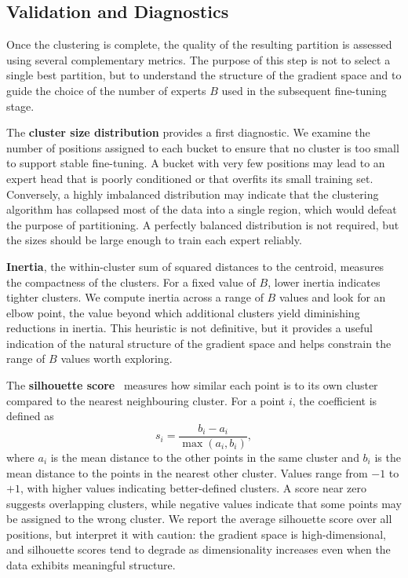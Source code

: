 \subsection{Validation and Diagnostics}\label{sec:cluster-val}

Once the clustering is complete, the quality of the resulting partition is assessed using several complementary metrics. The purpose of this step is not to select a single best partition, but to understand the structure of the gradient space and to guide the choice of the number of experts \(B\) used in the subsequent fine-tuning stage.

The \textbf{cluster size distribution} provides a first diagnostic. We examine the number of positions assigned to each bucket to ensure that no cluster is too small to support stable fine-tuning. A bucket with very few positions may lead to an expert head that is poorly conditioned or that overfits its small training set. Conversely, a highly imbalanced distribution may indicate that the clustering algorithm has collapsed most of the data into a single region, which would defeat the purpose of partitioning. A perfectly balanced distribution is not required, but the sizes should be large enough to train each expert reliably.

\textbf{Inertia}, the within-cluster sum of squared distances to the centroid, measures the compactness of the clusters. For a fixed value of \(B\), lower inertia indicates tighter clusters. We compute inertia across a range of \(B\) values and look for an elbow point, the value beyond which additional clusters yield diminishing reductions in inertia. This heuristic is not definitive, but it provides a useful indication of the natural structure of the gradient space and helps constrain the range of \(B\) values worth exploring.

The \textbf{silhouette score}~\cite{rousseeuw1987silhouettes} measures how similar each point is to its own cluster compared to the nearest neighbouring cluster. For a point \(i\), the coefficient is defined as
\[
s_i = \frac{b_i - a_i}{\max(a_i, b_i)},
\]
where \(a_i\) is the mean distance to the other points in the same cluster and \(b_i\) is the mean distance to the points in the nearest other cluster. Values range from \(-1\) to \(+1\), with higher values indicating better-defined clusters. A score near zero suggests overlapping clusters, while negative values indicate that some points may be assigned to the wrong cluster. We report the average silhouette score over all positions, but interpret it with caution: the gradient space is high-dimensional, and silhouette scores tend to degrade as dimensionality increases even when the data exhibits meaningful structure.

